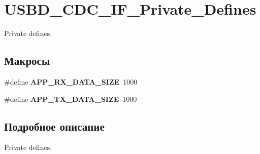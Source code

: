 \hypertarget{group___u_s_b_d___c_d_c___i_f___private___defines}{
\section{USBD\_\-CDC\_\-IF\_\-Private\_\-Defines}
\label{group___u_s_b_d___c_d_c___i_f___private___defines}
}
Private defines.  


\subsection*{Макросы}
\begin{CompactItemize}
\item 
\hypertarget{group___u_s_b_d___c_d_c___i_f___private___defines_gf3db03a3d03a80e1ec7a0a9c470d9692}{
\#define \textbf{APP\_\-RX\_\-DATA\_\-SIZE}~1000}
\label{group___u_s_b_d___c_d_c___i_f___private___defines_gf3db03a3d03a80e1ec7a0a9c470d9692}

\item 
\hypertarget{group___u_s_b_d___c_d_c___i_f___private___defines_gff35924b436331d533599db9489c79ee}{
\#define \textbf{APP\_\-TX\_\-DATA\_\-SIZE}~1000}
\label{group___u_s_b_d___c_d_c___i_f___private___defines_gff35924b436331d533599db9489c79ee}

\end{CompactItemize}


\subsection{Подробное описание}
Private defines. 